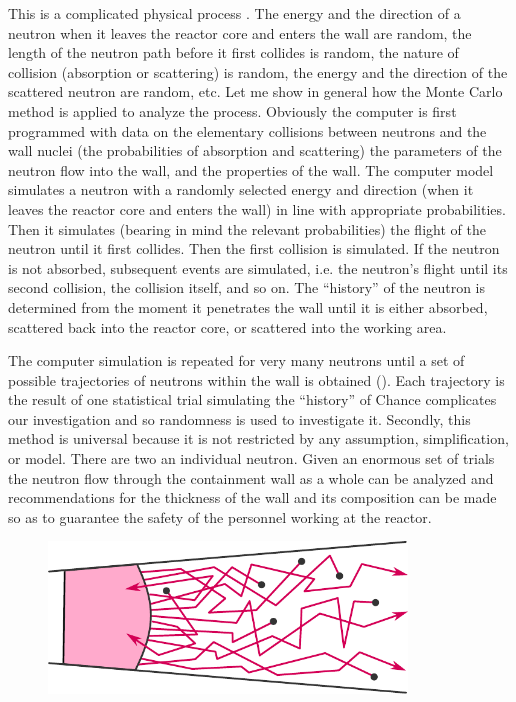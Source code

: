 This is a complicated physical process .
The energy and the direction of a neutron when it leaves the reactor
core and enters the wall are random, the length of the neutron path
before it first collides is random, the nature of collision (absorption or
scattering) is random, the energy and the direction of the scattered
neutron are random, etc. Let me show in general how the Monte Carlo
method is applied to analyze the process. Obviously the computer is
first programmed with data on the elementary collisions between
neutrons and the wall nuclei (the probabilities of absorption and
scattering) the parameters of the neutron flow into the wall, and the
properties of the wall. The computer model simulates a neutron with
a randomly selected energy and direction (when it leaves the reactor
core and enters the wall) in line with appropriate probabilities. Then it
simulates (bearing in mind the relevant probabilities) the flight of the
neutron until it first collides. Then the first collision is simulated. If the
neutron is not absorbed, subsequent events are simulated, i.e. the
neutron's flight until its second collision, the collision itself, and so on.
The ``history'' of the neutron is determined from the moment it
penetrates the wall until it is either absorbed, scattered back into the
reactor core, or scattered into the working area. 

The computer simulation is repeated for very many neutrons until a set of possible
trajectories of neutrons within the wall is obtained (). Each trajectory is the result of one statistical trial simulating the ``history'' of
Chance complicates our investigation and so randomness is used to
investigate it. Secondly, this method is universal because it is not
restricted by any assumption, simplification, or model. There are two
an individual neutron. Given an enormous set of trials the neutron flow
through the containment wall as a whole can be analyzed and
recommendations for the thickness of the wall and its composition can
be made so as to guarantee the safety of the personnel working at the
reactor.
 \begin{figure}[!h]
 \centering
 \includegraphics[width=0.85\textwidth]{figures/neutron-path.pdf}
 \end{figure}

